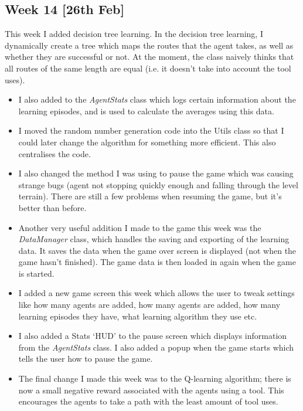 \documentclass[a4paper,oneside]{report}
\begin{document}
\subsection{Week 14 [26th Feb]}

This week I added decision tree learning. In the decision tree learning, I dynamically create a tree which maps the routes that the agent takes, as well as whether they are successful or not. At the moment, the class naively thinks that all routes of the same length are equal (i.e. it doesn't take into account the tool uses).

\begin{itemize}

\item I also added to the \emph{AgentStats} class which logs certain information about the learning episodes, and is used to calculate the averages using this data.

\item I moved the random number generation code into the Utils class so that I could later change the algorithm for something more efficient. This also centralises the code.

\item I also changed the method I was using to pause the game which was causing strange bugs (agent not stopping quickly enough and falling through the level terrain). There are still a few problems when resuming the game, but it's better than before.

\item Another very useful addition I made to the game this week was the \emph{DataManager} class, which handles the saving and exporting of the learning data. It saves the data when the game over screen is displayed (not when the game hasn't finished). The game data is then loaded in again when the game is started.

\item I added a new game screen this week which allows the user to tweak settings like how many agents are added, how many agents are added, how many learning episodes they have, what learning algorithm they use etc.

\item I also added a Stats `HUD' to the pause screen which displays information from the \emph{AgentStats} class. I also added a popup when the game starts which tells the user how to pause the game.

\item The final change I made this week was to the Q-learning algorithm; there is now a small negative reward associated with the agents using a tool. This encourages the agents to take a path with the least amount of tool uses.

\end{itemize}
\end{document}
